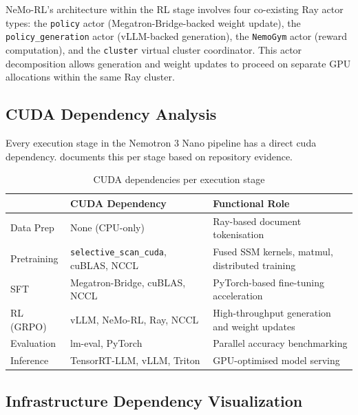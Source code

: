 NeMo-RL's architecture within the RL stage involves four co-existing
Ray actor types: the \texttt{policy} actor (Megatron-Bridge-backed weight
update), the \texttt{policy\_generation} actor (vLLM-backed generation),
the \texttt{NemoGym} actor (reward computation), and the
\texttt{cluster} virtual cluster coordinator. This actor decomposition
allows generation and weight updates to proceed on separate GPU allocations
within the same Ray cluster.

\subsection{CUDA Dependency Analysis}
\label{subsec:cuda-deps}

Every execution stage in the Nemotron 3 Nano pipeline has a direct
\acrshort{cuda} dependency.  documents this per stage
based on repository evidence.

\begin{table}[htbp]
  \centering
  \caption{CUDA dependencies per execution stage}
  \label{tab:cuda-deps}
  \begin{tabularx}{\textwidth}{l X X}
    \toprule
    \tableheader{Stage & CUDA Dependency & Functional Role} \\
    \midrule
    Data Prep
      & None (CPU-only)
      & Ray-based document tokenisation \\
    \rowcolor{TableRowOdd}
    Pretraining
      & \texttt{selective\_scan\_cuda}, cuBLAS, NCCL
      & Fused SSM kernels, matmul, distributed training \\
    SFT
      & Megatron-Bridge, cuBLAS, NCCL
      & PyTorch-based fine-tuning acceleration \\
    \rowcolor{TableRowOdd}
    RL (GRPO)
      & vLLM, NeMo-RL, Ray, NCCL
      & High-throughput generation and weight updates \\
    Evaluation
      & lm-eval, PyTorch
      & Parallel accuracy benchmarking \\
    \rowcolor{TableRowOdd}
    Inference
      & TensorRT-LLM, vLLM, Triton
      & GPU-optimised model serving \\
    \bottomrule
  \end{tabularx}
\end{table}

\subsection{Infrastructure Dependency Visualization}
\label{subsec:infra-viz}

